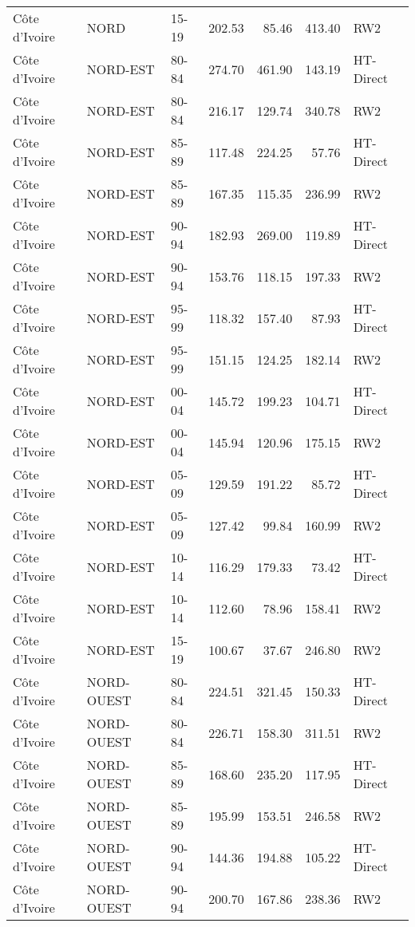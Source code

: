 \begin{longtable}{lllrrrl}
  C\^{o}te d'Ivoire & NORD & 15-19 & 202.53 & 85.46 & 413.40 & RW2 \\ 
  C\^{o}te d'Ivoire & NORD-EST & 80-84 & 274.70 & 461.90 & 143.19 & HT-Direct \\ 
  C\^{o}te d'Ivoire & NORD-EST & 80-84 & 216.17 & 129.74 & 340.78 & RW2 \\ 
  C\^{o}te d'Ivoire & NORD-EST & 85-89 & 117.48 & 224.25 & 57.76 & HT-Direct \\ 
  C\^{o}te d'Ivoire & NORD-EST & 85-89 & 167.35 & 115.35 & 236.99 & RW2 \\ 
  C\^{o}te d'Ivoire & NORD-EST & 90-94 & 182.93 & 269.00 & 119.89 & HT-Direct \\ 
  C\^{o}te d'Ivoire & NORD-EST & 90-94 & 153.76 & 118.15 & 197.33 & RW2 \\ 
  C\^{o}te d'Ivoire & NORD-EST & 95-99 & 118.32 & 157.40 & 87.93 & HT-Direct \\ 
  C\^{o}te d'Ivoire & NORD-EST & 95-99 & 151.15 & 124.25 & 182.14 & RW2 \\ 
  C\^{o}te d'Ivoire & NORD-EST & 00-04 & 145.72 & 199.23 & 104.71 & HT-Direct \\ 
  C\^{o}te d'Ivoire & NORD-EST & 00-04 & 145.94 & 120.96 & 175.15 & RW2 \\ 
  C\^{o}te d'Ivoire & NORD-EST & 05-09 & 129.59 & 191.22 & 85.72 & HT-Direct \\ 
  C\^{o}te d'Ivoire & NORD-EST & 05-09 & 127.42 & 99.84 & 160.99 & RW2 \\ 
  C\^{o}te d'Ivoire & NORD-EST & 10-14 & 116.29 & 179.33 & 73.42 & HT-Direct \\ 
  C\^{o}te d'Ivoire & NORD-EST & 10-14 & 112.60 & 78.96 & 158.41 & RW2 \\ 
  C\^{o}te d'Ivoire & NORD-EST & 15-19 & 100.67 & 37.67 & 246.80 & RW2 \\ 
  C\^{o}te d'Ivoire & NORD-OUEST & 80-84 & 224.51 & 321.45 & 150.33 & HT-Direct \\ 
  C\^{o}te d'Ivoire & NORD-OUEST & 80-84 & 226.71 & 158.30 & 311.51 & RW2 \\ 
  C\^{o}te d'Ivoire & NORD-OUEST & 85-89 & 168.60 & 235.20 & 117.95 & HT-Direct \\ 
  C\^{o}te d'Ivoire & NORD-OUEST & 85-89 & 195.99 & 153.51 & 246.58 & RW2 \\ 
  C\^{o}te d'Ivoire & NORD-OUEST & 90-94 & 144.36 & 194.88 & 105.22 & HT-Direct \\ 
  C\^{o}te d'Ivoire & NORD-OUEST & 90-94 & 200.70 & 167.86 & 238.36 & RW2 \\ 

\end{longtable}
